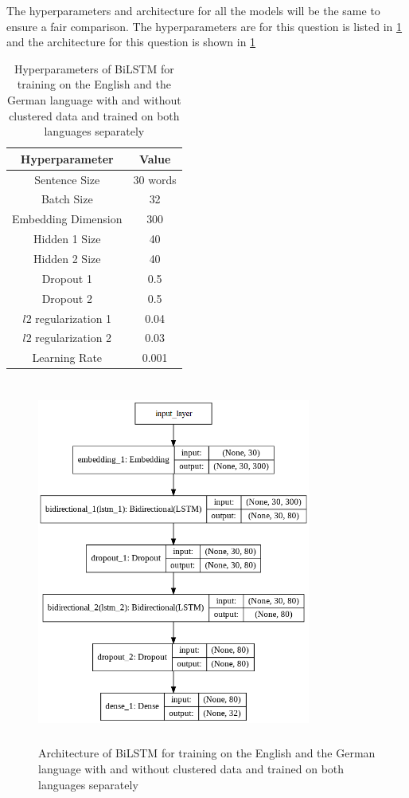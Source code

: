 The hyperparameters and architecture for all the models will be the same to ensure a fair comparison. The hyperparameters are for this question is listed in \ref{table:hyperParameterQuestion3} and the architecture for this question is shown in \ref{fig:architectureQuestion3}

\begin{table}[!ht]
\centering
\begin{tabular}{cc}
\hline
\textbf{Hyperparameter} & \textbf{Value} \\ \hline
Sentence Size & 30 words \\
Batch Size & 32 \\
Embedding Dimension & 300 \\
Hidden 1 Size & 40 \\
Hidden 2 Size & 40 \\
Dropout 1 & 0.5 \\
Dropout 2 & 0.5 \\
$l2$ regularization 1 & 0.04 \\
$l2$ regularization 2 & 0.03 \\
Learning Rate & 0.001 \\ \hline
\end{tabular}
\captionsetup{justification=centering,margin=1cm}
\caption{Hyperparameters of \gls{BiLSTM} for training on the English and the German language with and without clustered data and trained on both languages separately}
\label{table:hyperParameterQuestion3}
\end{table}

\begin{figure}[!ht]
    \centering
    \includegraphics[width=9cm, height=12cm]{pics/Question3.png}
    \captionsetup{justification=centering,margin=1cm}
    \caption{Architecture of \gls{BiLSTM} for training on the English and the German language with and without clustered data and trained on both languages separately}
    \label{fig:architectureQuestion3}
\end{figure}

